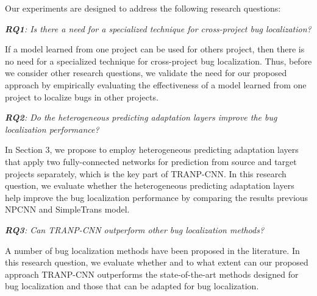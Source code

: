 
Our experiments are designed to address the following research questions:

\vspace{0.2cm}\noindent\textit{\textbf{RQ1}: Is there a need for a specialized technique for cross-project bug localization?}

If a model learned from one project can be used for others project, then there is no need for a specialized technique for cross-project bug localization. Thus, before we consider other research questions, we validate the need for our proposed approach by empirically evaluating the effectiveness of a model learned from one project to localize bugs in other projects.

\vspace{0.2cm}\noindent\textit{\textbf{RQ2}: Do the heterogeneous predicting adaptation layers improve the bug localization performance?}


In Section 3, we propose to employ heterogeneous predicting adaptation layers that apply two fully-connected networks for prediction from source and target projects separately, which is the key part of TRANP-CNN. In this research question, we evaluate whether the heterogeneous predicting adaptation layers help improve the bug localization performance by comparing the results previous NPCNN and SimpleTrans model. 

\vspace{0.2cm}\noindent\textit{\textbf{RQ3}: Can TRANP-CNN outperform other bug localization methods?}

A number of bug localization methods have been proposed in the literature. In this research question, we evaluate whether and to what extent can our proposed approach TRANP-CNN outperforms the state-of-the-art methods designed for bug localization and those that can be adapted for bug localization. 